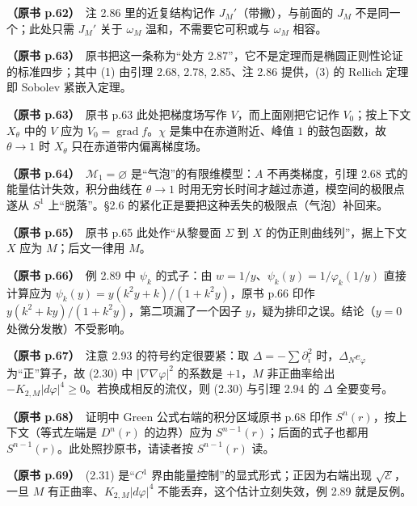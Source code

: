 \noindent \textbf{（原书 p.62）}\ 注 2.86 里的近复结构记作 $J_M'$（带撇），与前面的 $J_M$ 不是同一个；此处只需 $J_M'$ 关于 $\omega_M$ 温和，不需要它可积或与 $\omega_M$ 相容。\par\smallskip

\noindent \textbf{（原书 p.63）}\ 原书把这一条称为“处方 2.87”，它不是定理而是椭圆正则性论证的标准四步；其中 (1) 由引理 2.68, 2.78, 2.85、注 2.86 提供，(3) 的 Rellich 定理即 Sobolev 紧嵌入定理。\par\smallskip

\noindent \textbf{（原书 p.63）}\ 原书 p.63 此处把梯度场写作 $V$，而上面刚把它记作 $V_0$；按上下文 $X_\theta$ 中的 $V$ 应为 $V_0=\operatorname{grad}f$。$\chi$ 是集中在赤道附近、峰值 $1$ 的鼓包函数，故 $\theta\to1$ 时 $X_\theta$ 只在赤道带内偏离梯度场。\par\smallskip

\noindent \textbf{（原书 p.64）}\ $\mathcal{M}_1=\varnothing$ 是“气泡”的有限维模型：$A$ 不再类梯度，引理 2.68 式的能量估计失效，积分曲线在 $\theta\to1$ 时用无穷长时间才越过赤道，模空间的极限点遂从 $S^1$ 上“脱落”。§2.6 的紧化正是要把这种丢失的极限点（气泡）补回来。\par\smallskip

\noindent \textbf{（原书 p.65）}\ 原书 p.65 此处作“从黎曼面 $\Sigma$ 到 $X$ 的伪正則曲线列”，据上下文 $X$ 应为 $M$；后文一律用 $M$。\par\smallskip

\noindent \textbf{（原书 p.66）}\ 例 2.89 中 $\psi_k$ 的式子：由 $w=1/y$、$\psi_k(y)=1/\varphi_k(1/y)$ 直接计算应为 $\psi_k(y)=y(k^2y+k)/(1+k^2y)$，原书 p.66 印作 $y(k^2+ky)/(1+k^2y)$，第二项漏了一个因子 $y$，疑为排印之误。结论（$y=0$ 处微分发散）不受影响。\par\smallskip

\noindent \textbf{（原书 p.67）}\ 注意 2.93 的符号约定很要紧：取 $\Delta=-\sum\partial_i^2$ 时，$\Delta_N e_\varphi$ 为“正”算子，故 (2.30) 中 $|\nabla\nabla\varphi|^2$ 的系数是 $+1$，$M$ 非正曲率给出 $-K_{2,M}|d\varphi|^4\ge0$。若换成相反的流仪，则 (2.30) 与引理 2.94 的 $\Delta$ 全要变号。\par\smallskip

\noindent \textbf{（原书 p.68）}\ 证明中 Green 公式右端的积分区域原书 p.68 印作 $S^n(r)$，按上下文（等式左端是 $D^n(r)$ 的边界）应为 $S^{n-1}(r)$；后面的式子也都用 $S^{n-1}(r)$。此处照抄原书，请读者按 $S^{n-1}(r)$ 读。\par\smallskip

\noindent \textbf{（原书 p.69）}\ (2.31) 是“$C^1$ 界由能量控制”的显式形式；正因为右端出现 $\sqrt{\mathcal{E}}$，一旦 $M$ 有正曲率、$K_{2,M}|d\varphi|^4$ 不能丢弃，这个估计立刻失效，例 2.89 就是反例。\par\smallskip

